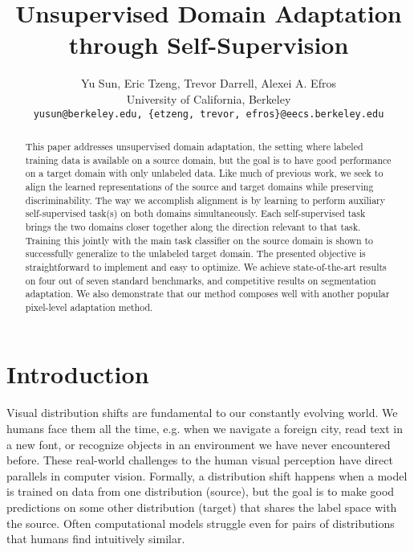 \documentclass{article} \usepackage{iclr2020_conference,times}
\title{Unsupervised Domain Adaptation \\
	through Self-Supervision}
\author{Yu Sun,
	Eric Tzeng,
	Trevor Darrell,
	Alexei A. Efros\\
	University of California, Berkeley\\
	\texttt{yusun@berkeley.edu,
	\{etzeng, trevor, efros\}@eecs.berkeley.edu} \\
}
\begin{document}
\maketitle

\begin{abstract}
   This paper addresses unsupervised domain adaptation, the setting where labeled training data is available on a source domain, but the goal is to have good performance on a target domain with only unlabeled data.
Like much of previous work, we seek to align the learned representations of the source and target domains while preserving discriminability. The way we accomplish alignment is by learning to perform auxiliary self-supervised task(s) on both domains simultaneously.  Each self-supervised task brings the two domains closer together along the direction relevant to that task. Training this jointly with the main task classifier on the source domain is shown to successfully generalize to the unlabeled target domain. 
The presented objective is straightforward to implement and easy to optimize.
We achieve state-of-the-art results on four out of seven standard benchmarks, and competitive results on segmentation adaptation. We also demonstrate that our method composes well with another popular pixel-level adaptation method.
\end{abstract}

\makeatletter
\def\blfootnote{\xdef\@thefnmark{}\@footnotetext}
\makeatother


\section{Introduction}
\label{intro}

Visual distribution shifts are fundamental to our constantly evolving world.
We humans face them all the time, e.g. when we navigate a foreign city, read text in a new font, or recognize objects in an environment we have never encountered before.
These real-world challenges to the human visual perception have direct parallels in computer vision. 
Formally, a distribution shift happens when a model is trained on data from one distribution (source), but the goal is to make good predictions on some other distribution (target) that shares the label space with the source.
Often computational models struggle even for pairs of distributions that humans find intuitively similar.
\end{document}
